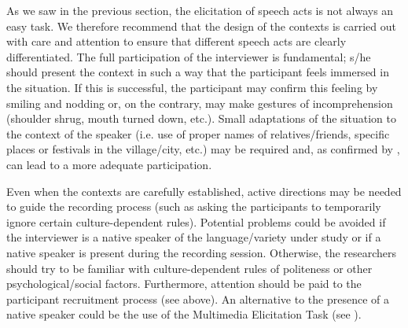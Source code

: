 \documentclass[output=paper]{LSP/langsci}
\begin{document}
As we saw in the previous section, the elicitation of speech acts is not always an easy task. We therefore recommend that the design of the contexts is carried out with care and attention to ensure that different speech acts are clearly differentiated. The full participation of the interviewer is fundamental; s/he should present the context in such a way that the participant feels immersed in the situation. If this is successful, the participant may confirm this feeling by smiling and nodding or, on the contrary, may make gestures of incomprehension (shoulder shrug, mouth turned down, etc.). Small adaptations of the situation to the context of the speaker (i.e. use of proper names of relatives/friends, specific places or festivals in the village/city, etc.) may be required and, as confirmed by \citet{Billmyer2000}, can lead to a more adequate participation.

Even when the contexts are carefully established, active directions may be needed to guide the recording process (such as asking the par\-ti\-ci\-pants to temporarily ignore certain culture-dependent rules). Potential problems could be avoided if the interviewer is a native speaker of the language/variety under study or if a native speaker is present during the recording session. Otherwise, the researchers should try to be familiar with culture-dependent rules of politeness or other psychological/social factors. Furthermore, attention should be paid to the participant recruitment process (see above). An alternative to the presence of a native speaker could be the use of the Multimedia Elicitation Task (see \citealt{Schauer2004}).
\end{document}
